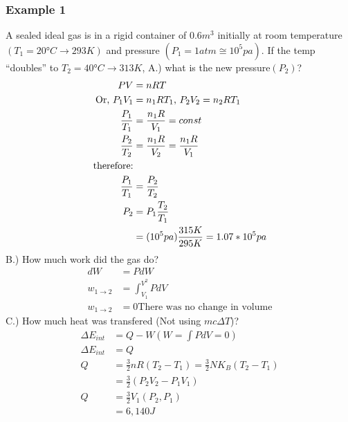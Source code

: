 	\subsubsection{Example 1}
	A sealed ideal gas is in a rigid container of $0.6m^3$ initially at room temperature $(T_1=20\si{\degree}C\to 293K)$ and pressure $(P_1=1atm\cong 10^5pa)$. If the temp ``doubles'' to $T_2=40\si{\degree}C\to313K$,
	\newline A.) what is the new pressure$(P_2)$?
	\begin{align*}
	\newline
	PV&=nRT\\
	\text{Or, }P_1V_1&=n_1RT_1 \text{, }P_2V_2=n_2RT_1\\
	\frac{P_1}{T_1}&=\frac{n_1R}{V_1} = const\\
	\frac{P_2}{T_2}&=\frac{n_1R}{V_2} = \frac{n_1R}{V_1}\\
	\text{therefore:}\\
	\frac{P_1}{T_1}&=\frac{P_2}{T_2}\\
	P_2&=P_1\frac{T_2}{T_1}\\
	&=(10^5pa)\frac{315K}{295K}=1.07*10^5pa
	\end{align*}
	B.) How much work did the gas do?
	\begin{align*}
	dW&=PdW\\
	w_{1\to2}&=\int_{V_1}^{V^2}{PdV}\\
	w_{1\to2}&=0
	\text{There was no change in volume}
	\end{align*}
	C.) How much heat was transfered (Not using $mc\Delta T$)?
	\begin{align*}
	\Delta E_{int}&=Q-W (W=\int{PdV}=0)\\
	\Delta E_{int}&=Q\\
	Q&=\frac{3}{2}nR(T_2-T_1)=\frac{3}{2}NK_B(T_2-T_1)\\
	&=\frac{3}{2}(P_2V_2-P_1V_1)\\
	Q&= \frac{3}{2}V_1(P_2,P_1)\\
	&=6,140J
	\end{align*}
